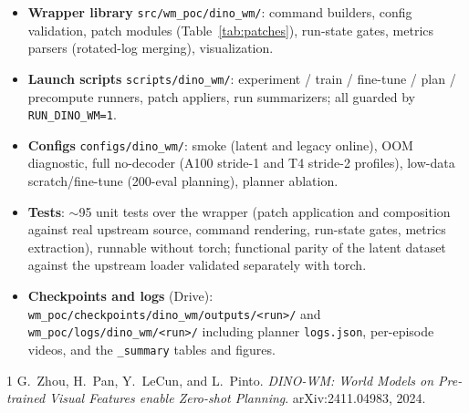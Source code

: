 \documentclass[11pt]{article}
\begin{document}
\begin{itemize}
\item \textbf{Wrapper library} \texttt{src/wm\_poc/dino\_wm/}: command
      builders, config validation, patch modules
      (Table~\ref{tab:patches}), run-state gates, metrics parsers
      (rotated-log merging), visualization.
\item \textbf{Launch scripts} \texttt{scripts/dino\_wm/}: experiment /
      train / fine-tune / plan / precompute runners, patch appliers, run
      summarizers; all guarded by \texttt{RUN\_DINO\_WM=1}.
\item \textbf{Configs} \texttt{configs/dino\_wm/}: smoke (latent and legacy
      online), OOM diagnostic, full no-decoder (A100 stride-1 and T4
      stride-2 profiles), low-data scratch/fine-tune (200-eval planning),
      planner ablation.
\item \textbf{Tests}: $\sim$95 unit tests over the wrapper (patch
      application and composition against real upstream source, command
      rendering, run-state gates, metrics extraction), runnable without
      torch; functional parity of the latent dataset against the upstream
      loader validated separately with torch.
\item \textbf{Checkpoints and logs} (Drive):
      \texttt{wm\_poc/checkpoints/dino\_wm/outputs/<run>/} and
      \texttt{wm\_poc/logs/dino\_wm/<run>/} including planner
      \texttt{logs.json}, per-episode videos, and the \texttt{\_summary}
      tables and figures.
\end{itemize}

\begin{thebibliography}{1}
 G.~Zhou, H.~Pan, Y.~LeCun, and L.~Pinto.
\emph{DINO-WM: World Models on Pre-trained Visual Features enable Zero-shot
Planning}. arXiv:2411.04983, 2024.
\end{thebibliography}
\end{document}
